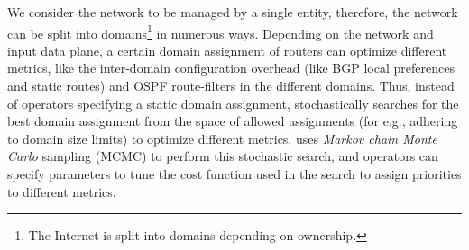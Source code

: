 We consider the network to be managed by a 
single entity, therefore, the network can 
be split into domains\footnote{
The Internet is split into domains depending 
on ownership.} in numerous ways. Depending
on the network and input data plane, a certain
domain assignment of routers 
can optimize different metrics, like the
inter-domain configuration overhead (like BGP local
preferences and static routes) and OSPF route-filters
in the different domains. Thus, instead of operators
specifying a static domain assignment, \name stochastically
searches for the best domain assignment from the space of 
allowed assignments (for e.g., adhering to domain size limits)
to optimize different metrics. \name uses 
\emph{Markov chain Monte Carlo} sampling (MCMC) to perform
this stochastic search, and operators can specify parameters
to tune the cost function used in the search to assign priorities
to different metrics. 










